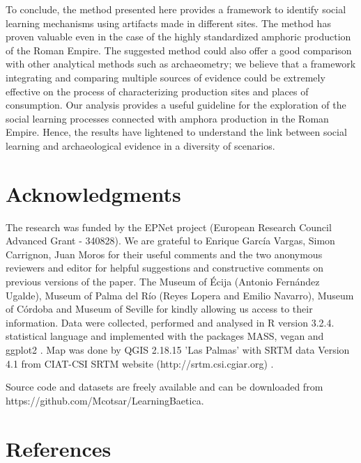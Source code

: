 \documentclass[review]{elsarticle}
\begin{document}
To conclude, the method presented here provides a framework to identify social learning mechanisms using artifacts made in different sites. The method has proven valuable even in the case of the highly standardized amphoric production of the Roman Empire. The suggested method could also offer a good comparison with other analytical methods such as archaeometry; we believe that a framework integrating and comparing multiple sources of evidence could be extremely effective on the process of characterizing production sites and places of consumption. Our analysis provides a useful guideline for the exploration of the social learning processes connected with amphora production in the Roman Empire. Hence, the results have lightened to understand the link between social learning and archaeological evidence in a diversity of scenarios. 
 

\section{Acknowledgments}

The research was funded by the EPNet project (European Research Council Advanced Grant - 340828). We are grateful to Enrique Garc\'ia Vargas, Simon Carrignon, Juan Moros for their useful comments and the two anonymous reviewers and editor for helpful suggestions and constructive comments on previous versions of the paper. The Museum of \'Ecija (Antonio Fern\'andez Ugalde), Museum of Palma del R\'io (Reyes Lopera and Emilio Navarro), Museum of C\'ordoba and Museum of Seville for kindly allowing us access to their information. Data were collected, performed and analysed in R version 3.2.4. statistical language and implemented with the packages MASS, vegan and ggplot2 \citep{ripley_package_2013,oksanen_vegan_2007,ggplot2:_2016}. Map was done by QGIS 2.18.15 'Las Palmas' with SRTM data Version 4.1 from CIAT-CSI SRTM website (http://srtm.csi.cgiar.org) \citep{SRTM}. 

Source code and datasets are freely available and can be downloaded from https://github.com/Mcotsar/LearningBaetica.  

\section*{References}


\end{document}
